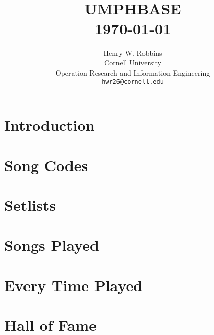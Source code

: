 \documentclass[8pt]{book}
\title{	\normalsize \textsc{} 					%
        \\[2.0cm]								
        \HRule{2pt} \\ [0.5cm]		
	\Huge \textbf{\uppercase{UMPHBASE}}	%
	\HRule{2pt} \\ [0.5cm]
	\large \today						%
}
\author{
	Henry W. Robbins\\	
	Cornell University\\	
	Operation Research and Information Engineering\\
        \texttt{hwr26@cornell.edu} \\
}
\makeatletter
\let\mcnewpage=\newpage
\newcommand{\TrickSupertabularIntoMulticols}{
\renewcommand\newpage{
    \if@firstcolumn
        \hrule width\linewidth height0pt
            \columnbreak
        \else
          \mcnewpage
        \fi
}}
\def\printtitle{%
    {\centering \@title\par}}
\def\printauthor{					
    {\centering \large \@author}}
\makeatother
\begin{document}
\thispagestyle{empty}		
\printtitle					
\vfill
\printauthor				
\newpage

\tableofcontents
\newpage

\chapter{Introduction}

\chapter{Song Codes}

\begin{multicols*}{4}
\TrickSupertabularIntoMulticols
\begin{footnotesize}

\end{footnotesize}
\end{multicols*}

\chapter{Setlists}



\chapter{Songs Played}


\newpage
\setlength{\tabcolsep}{3.5pt}


\chapter{Every Time Played}

\begin{multicols*}{4}
\TrickSupertabularIntoMulticols
\begin{footnotesize}

\end{footnotesize}
\end{multicols*}

\chapter{Hall of Fame}

\begin{multicols*}{3}
\TrickSupertabularIntoMulticols

\end{multicols*}
\end{document}
